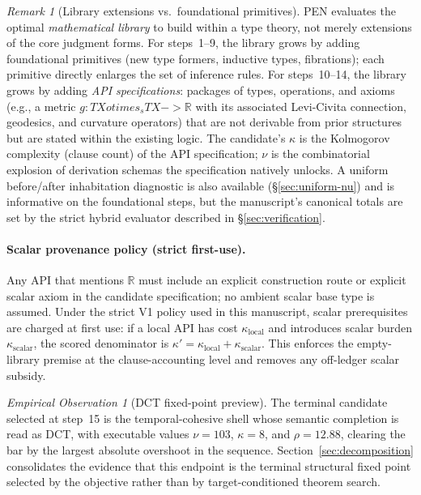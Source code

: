 \documentclass[11pt,a4paper]{article}
\def\to{->}%
\def\otimes{otimes}%
\theoremstyle{plain}
\theoremstyle{definition}
\theoremstyle{remark}
\newtheorem{remark}[theorem]{Remark}
\newtheorem{observation}[theorem]{Empirical Observation}
\newcommand{\R}{\mathbb{R}}
\begin{document}
\begin{remark}[Library extensions vs.\ foundational primitives]
\label{rem:library-api}
PEN evaluates the optimal \emph{mathematical library} to build within a type theory, not merely extensions of the core judgment forms.
For steps~1--9, the library grows by adding foundational primitives (new type formers, inductive types, fibrations); each primitive directly enlarges the set of inference rules.
For steps~10--14, the library grows by adding \emph{API specifications}: packages of types, operations, and axioms (e.g., a metric $g : TX \otimes_s TX \to \R$ with its associated Levi-Civita connection, geodesics, and curvature operators) that are not derivable from prior structures but are stated within the existing logic.
The candidate's $\kappa$ is the Kolmogorov complexity (clause count) of the API specification; $\nu$ is the combinatorial explosion of derivation schemas the specification natively unlocks.
A uniform before/after inhabitation diagnostic is also available (\S\ref{sec:uniform-nu}) and is informative on the foundational steps, but the manuscript's canonical totals are set by the strict hybrid evaluator described in \S\ref{sec:verification}.
\paragraph{Scalar provenance policy (strict first-use).}
Any API that mentions $\R$ must include an explicit construction route or explicit scalar axiom in the candidate specification; no ambient scalar base type is assumed.
Under the strict V1 policy used in this manuscript, scalar prerequisites are charged at first use: if a local API has cost $\kappa_{\mathrm{local}}$ and introduces scalar burden $\kappa_{\mathrm{scalar}}$, the scored denominator is $\kappa' = \kappa_{\mathrm{local}} + \kappa_{\mathrm{scalar}}$.
This enforces the empty-library premise at the clause-accounting level and removes any off-ledger scalar subsidy.
\end{remark}

\begin{observation}[DCT fixed-point preview]
\label{thm:spectral-preview}
The terminal candidate selected at step~15 is the temporal-cohesive shell whose semantic completion is read as DCT, with executable values $\nu=103$, $\kappa=8$, and $\rho=12.88$, clearing the bar by the largest absolute overshoot in the sequence.
Section~\ref{sec:decomposition} consolidates the evidence that this endpoint is the terminal structural fixed point selected by the objective rather than by target-conditioned theorem search.
\end{observation}
\end{document}
